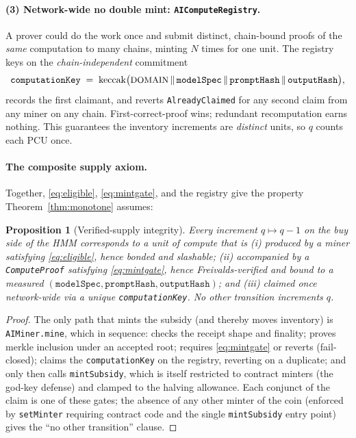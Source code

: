 \documentclass[11pt]{article}
\newtheorem{proposition}[theorem]{Proposition}
\newcommand{\keccak}{\ensuremath{\mathrm{keccak}}}
\newcommand{\code}[1]{\texttt{#1}}
\begin{document}
\paragraph{(3) Network-wide no double mint: \code{AIComputeRegistry}.} A prover
could do the work once and submit distinct, chain-bound proofs of the \emph{same}
computation to many chains, minting $N$ times for one unit. The registry keys on
the \emph{chain-independent} commitment
\begin{equation}
\code{computationKey} \;=\;
\keccak\big(\text{\small DOMAIN}\,\|\,\code{modelSpec}\,\|\,\code{promptHash}
  \,\|\,\code{outputHash}\big),
\end{equation}
records the first claimant, and reverts \code{AlreadyClaimed} for any second claim
from any miner on any chain. First-correct-proof wins; redundant recomputation
earns nothing. This guarantees the inventory increments are \emph{distinct} units,
so $q$ counts each PCU once.

\paragraph{The composite supply axiom.} Together, \eqref{eq:eligible},
\eqref{eq:mintgate}, and the registry give the property
Theorem~\ref{thm:monotone} assumes:

\begin{proposition}[Verified-supply integrity]
\label{prop:supply}
Every increment $q\mapsto q-1$ on the buy side of the HMM corresponds to a unit of
compute that is (i) produced by a miner satisfying \eqref{eq:eligible}, hence bonded
and slashable; (ii) accompanied by a \code{ComputeProof} satisfying
\eqref{eq:mintgate}, hence Freivalds-verified and bound to a measured
$(\code{modelSpec},\code{promptHash},\code{outputHash})$; and (iii) claimed once
network-wide via a unique \code{computationKey}. No other transition increments
$q$.
\end{proposition}

\begin{proof}
The only path that mints the subsidy (and thereby moves inventory) is
\code{AIMiner.mine}, which in sequence: checks the receipt shape and finality;
proves merkle inclusion under an accepted root; requires \eqref{eq:mintgate} or
reverts (fail-closed); claims the \code{computationKey} on the registry, reverting
on a duplicate; and only then calls \code{mintSubsidy}, which is itself restricted
to contract minters (the god-key defense) and clamped to the halving allowance.
Each conjunct of the claim is one of these gates; the absence of any other minter
of the coin (enforced by \code{setMinter} requiring contract code and the
single \code{mintSubsidy} entry point) gives the ``no other transition'' clause.
\end{proof}
\end{document}
